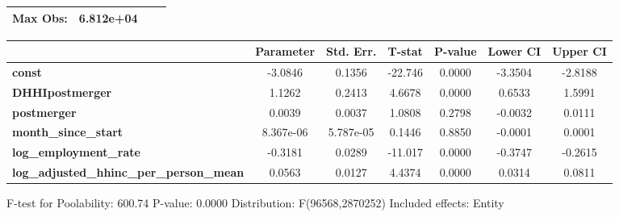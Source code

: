 \documentclass{report}
\begin{document}
\begin{center}
\begin{tabular}{lclc}
\textbf{Max Obs:}                                &      6.812e+04       & \textbf{                     }   &                  \\
\bottomrule
\end{tabular}
\begin{tabular}{lcccccc}
                                                 & \textbf{Parameter} & \textbf{Std. Err.} & \textbf{T-stat} & \textbf{P-value} & \textbf{Lower CI} & \textbf{Upper CI}  \\
\midrule
\textbf{const}                                   &      -3.0846       &       0.1356       &     -22.746     &      0.0000      &      -3.3504      &      -2.8188       \\
\textbf{DHHIpostmerger}                          &       1.1262       &       0.2413       &      4.6678     &      0.0000      &       0.6533      &       1.5991       \\
\textbf{postmerger}                              &       0.0039       &       0.0037       &      1.0808     &      0.2798      &      -0.0032      &       0.0111       \\
\textbf{month\_since\_start}                     &     8.367e-06      &     5.787e-05      &      0.1446     &      0.8850      &      -0.0001      &       0.0001       \\
\textbf{log\_employment\_rate}                   &      -0.3181       &       0.0289       &     -11.017     &      0.0000      &      -0.3747      &      -0.2615       \\
\textbf{log\_adjusted\_hhinc\_per\_person\_mean} &       0.0563       &       0.0127       &      4.4374     &      0.0000      &       0.0314      &       0.0811       \\
\bottomrule
\end{tabular}
\end{center}

F-test for Poolability: 600.74 \newline
 P-value: 0.0000 \newline
 Distribution: F(96568,2870252) \newline
  \newline
 Included effects: Entity
\end{document}
